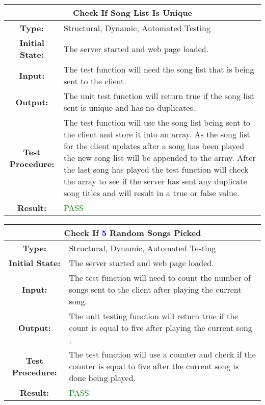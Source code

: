 \documentclass[12pt, titlepage]{article}
\newcommand{\numberOfSongs}{\textcolor{blue}{5 }}
\begin{document}
\begin{center}
\begin{table}[H]
\begin{tabularx}{\textwidth}{| c X |}
\hline
\multicolumn{2}{|c|}{\textbf{Check If Song List Is Unique}}\\
\hline
\textbf{Type: } & Structural, Dynamic, Automated Testing\\


\textbf{Initial State: } & The server started and web page loaded.\\


\textbf{Input: } & The test function will need the song list that is being sent to the client.\\


\textbf{Output: } & The unit test function will return true if the song list sent is unique and has no duplicates.\\


\textbf{Test Procedure: } &The test function will use the song list being sent to the client and store it into an array. As the song list for the client updates after a song has been played the new song list will be appended to the array. After the last song has played the test function will check the array to see if the server has sent any duplicate song titles and will result in a true or false value. \\


\textbf{Result: } & \textcolor{green}{PASS}\\
\hline
\end{tabularx}
\end{table}
\end{center}


\begin{center}
\begin{table}[H]
\begin{tabularx}{\textwidth}{| c X |}
\hline
\multicolumn{2}{|c|}{\textbf{Check If \numberOfSongs Random Songs Picked}}\\

\hline
\textbf{Type: } & Structural, Dynamic, Automated Testing\\


\textbf{Initial State: } & The server started and web page loaded.\\


\textbf{Input: } & The test function will need to count the number of songs sent to the client after playing the current song.\\


\textbf{Output: } & The unit testing function will return true if the count is equal to five after playing the current song .\\


\textbf{Test Procedure: } &The test function will use a counter and check if the counter is equal to five after the current song is done being played. \\


\textbf{Result: } & \textcolor{green}{PASS}\\
\hline
\end{tabularx}
\end{table}
\end{center}
\end{document}
